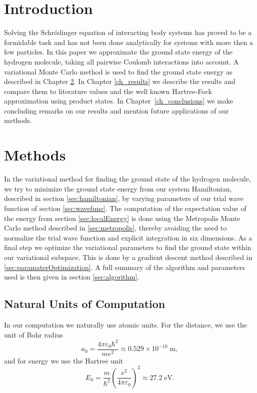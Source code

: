 \documentclass[twoside]{article}
\newcommand{\unit}[1]{\ensuremath{\; \mathrm{#1}}}
\begin{document}
\section{Introduction}
Solving the Schr\"odinger equation of interacting body systems has proved to be a formidable task and has not been done analytically for systems with more then a few particles. In this paper we approximate the ground state energy of the hydrogen molecule, taking all pairwise Coulomb interactions into account. A variational Monte Carlo method  is used to find the ground state energy as described in Chapter \ref{ch_methods}. In Chapter \ref{ch_results} we describe the results and compare them to literature values and the well known Hartree-Fock approximation using product states. In Chapter~\ref{ch_conclusions} we make concluding remarks on our results and mention future applications of our methods.


\section{Methods}\label{ch_methods}
 In the variational method for finding the ground state of the hydrogen molecule, we try to minimize the ground state energy from our system Hamiltonian, described in section \ref{sec:hamiltonian}, by varying parameters of our trial wave function of section \ref{sec:wavefunc}. The computation of the expectation value of the energy from section \ref{sec:localEnergy} is done using the Metropolis Monte Carlo method described in \ref{sec:metropolis}, thereby avoiding the need to normalize the trial wave function and explicit integration in six dimensions. As a final step we optimize the variational parameters to find the ground state within our variational subspace. This is done by a gradient descent method described in \ref{sec:paramaterOptimization}. A full summary of the algorithm and parameters used is then given in section \ref{sec:algorithm}.

\subsection{Natural Units of Computation}\label{sec:au}
In our computation we naturally use atomic units. For the distance, we use the unit of Bohr radius
\begin{equation}
a_0 = \frac{4\pi \varepsilon_0 \hbar^2}{me^2} \approx 0.529 \times 10^{-10} \unit{m},
\end{equation}
and for energy we use the Hartree unit
\begin{equation}
E_0 = \frac{m}{\hbar^2} \left(\frac{e^2}{4\pi \varepsilon_0}\right)^2 \approx 27.2 \unit{eV}. 
\end{equation}
\end{document}
